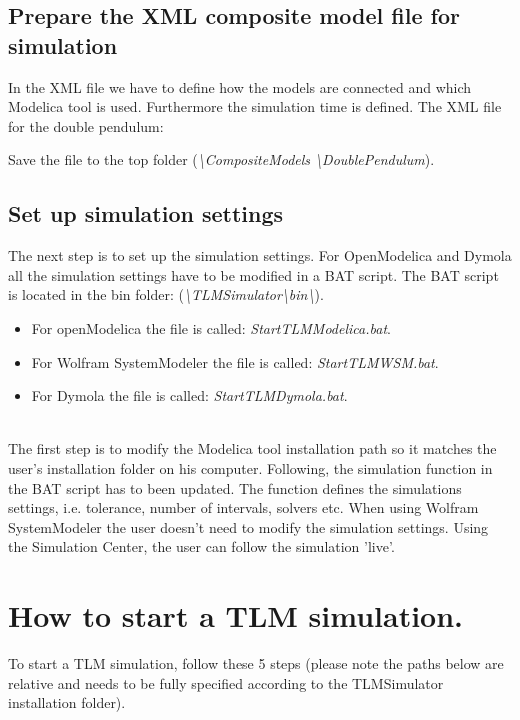 \subsection{Prepare the XML composite model file for simulation }
In the XML file we have to define how the models are connected and which Modelica tool is used. 
Furthermore the simulation time is defined.
The XML file for the double pendulum: 
~\\

Save the file to the top folder (\textit{\textbackslash CompositeModels \textbackslash DoublePendulum}).

\subsection{Set up simulation settings}
The next step is to set up the simulation settings. 
For OpenModelica and Dymola all the simulation settings have to be modified in a BAT script. 
The BAT script is located in the bin folder: (\textit{\textbackslash TLMSimulator\textbackslash bin\textbackslash}).


\begin{itemize}
  \item For openModelica the file is called: \textit{StartTLMModelica.bat}.
  \item For Wolfram SystemModeler the file is called: \textit{StartTLMWSM.bat}.
  \item For Dymola the file is called: \textit{StartTLMDymola.bat}.
\end{itemize}

~\\The first step is to modify the Modelica tool installation path so it matches the user's installation folder on his computer. 
Following, the simulation function in the BAT script has to been updated. 
The function defines the simulations settings, i.e. tolerance, number of intervals, solvers etc. 
When using Wolfram SystemModeler the user doesn't need to modify the simulation settings. 
Using the Simulation Center, the user can follow the simulation 'live'.

\section{How to start a TLM simulation.}

To start a TLM simulation, follow these 5 steps (please note the paths below are relative and needs to be fully specified according to the TLMSimulator installation folder).

